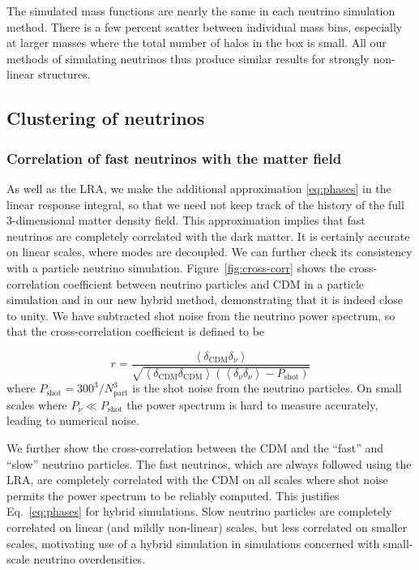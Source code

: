 \documentclass[useAMS, usenatbib]{mnras}
\begin{document}
The simulated mass functions are nearly the same in each neutrino simulation method.
There is a few percent scatter between individual mass bins, especially at larger masses where the total number of halos in the box is small. All our methods of simulating neutrinos thus produce similar results for strongly non-linear structures.

\subsection{Clustering of neutrinos}
\label{sec:nupower}

\subsubsection{Correlation of fast neutrinos with the matter field}

As well as the LRA, we make the additional approximation \eqref{eq:phases} in the linear response integral, so that we need not keep track of the history of the full 3-dimensional matter density field. This approximation implies that fast neutrinos are completely correlated with the dark matter. It is certainly accurate on linear scales, where modes are decoupled. We can further check its consistency with a particle neutrino simulation. Figure~\ref{fig:cross-corr} shows the cross-correlation coefficient between neutrino particles and CDM in a particle simulation and in our new hybrid method, demonstrating that it is indeed close to unity. We have subtracted shot noise from the neutrino power spectrum, so that the cross-correlation coefficient is defined to be

\begin{equation}
 r = \frac{\left<\delta_\mathrm{CDM} \delta_\nu \right>}{\sqrt{\left<\delta_\mathrm{CDM} \delta_\mathrm{CDM} \right>\left(\left<\delta_\nu \delta_\nu \right> - P_\mathrm{shot}\right)}}
\end{equation}
where $P_\mathrm{shot} = 300^3 / N_\mathrm{part}^3$ is the shot noise from the neutrino particles. On small scales where $P_\nu \ll P_\mathrm{shot}$ the power spectrum is hard to measure accurately, leading to numerical noise.

We further show the cross-correlation between the CDM and the ``fast'' and ``slow'' neutrino particles. The fast neutrinos, which are always followed using the LRA, are completely correlated with the CDM on all scales where shot noise permits the power spectrum to be reliably computed. This justifies Eq.~\eqref{eq:phases} for hybrid simulations. Slow neutrino particles are completely correlated on linear (and mildly non-linear) scales, but less correlated on smaller scales, motivating use of a hybrid simulation in simulations concerned with small-scale neutrino overdensities.
\end{document}
